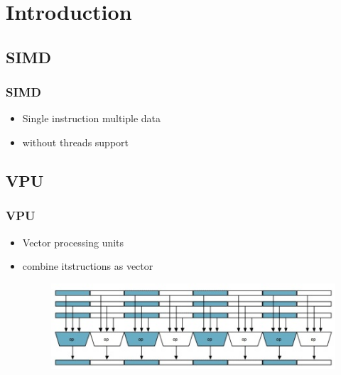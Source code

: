 \section{Introduction}

\subsection{SIMD}
\begin{frame}
    \frametitle{SIMD}
	\begin{itemize}
		\item Single instruction multiple data
		\item without threads support
	\end{itemize}
\end{frame}


\subsection{VPU}
\begin{frame}
    \frametitle{VPU}
	\begin{itemize}
		\item Vector processing units 
		\item combine itstructions as vector	
	    \begin{figure}
			\includegraphics[scale=0.5]{figure/vpu.jpg}
		\end{figure}
	\end{itemize}
\end{frame}

